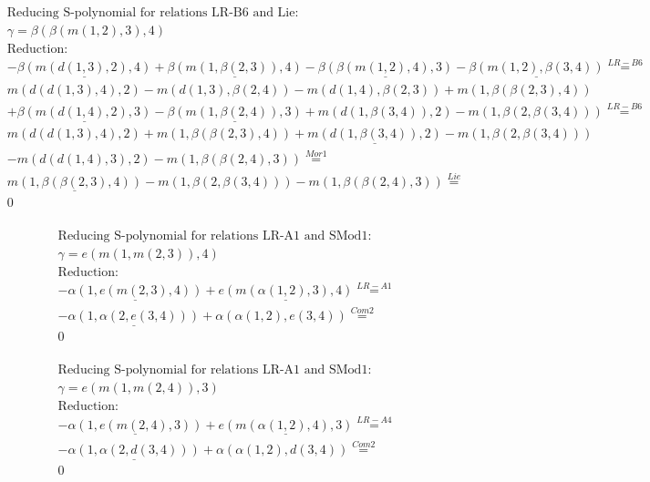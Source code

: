 \documentclass[11pt]{amsart}
\begin{document}
\begin{align*} 
& \text{Reducing S-polynomial for relations LR-B6 and Lie:} \\ 
& \gamma = \beta(\beta(m(1,2),3),4) \\ 
& \text{Reduction}: \\& - \underline{\beta(m(d(1,3),2),4)} + \underline{\beta(m(1,\beta(2,3)),4)} - \underline{\beta(\beta(m(1,2),4),3)} - \underline{\beta(m(1,2),\beta(3,4))} \stackrel{ LR-B6 }{=}  \\ 
&m(d(d(1,3),4),2) - m(d(1,3),\beta(2,4)) - m(d(1,4),\beta(2,3)) + m(1,\beta(\beta(2,3),4))\\ 
 &  + \underline{\beta(m(d(1,4),2),3)} - \underline{\beta(m(1,\beta(2,4)),3)} + m(d(1,\beta(3,4)),2) - m(1,\beta(2,\beta(3,4))) \stackrel{ LR-B6 }{=}  \\ 
&m(d(d(1,3),4),2) + m(1,\beta(\beta(2,3),4)) + \underline{m(d(1,\beta(3,4)),2)} - m(1,\beta(2,\beta(3,4)))\\ 
 &  - m(d(d(1,4),3),2) - m(1,\beta(\beta(2,4),3)) \stackrel{ Mor1 }{=}  \\ 
&\underline{m(1,\beta(\beta(2,3),4))} - m(1,\beta(2,\beta(3,4))) - m(1,\beta(\beta(2,4),3)) \stackrel{ Lie }{=}  \\ 
&0\\ 
\end{align*} 
 
\begin{align*} 
& \text{Reducing S-polynomial for relations LR-A1 and SMod1:} \\ 
& \gamma = e(m(1,m(2,3)),4) \\ 
& \text{Reduction}: \\& - \underline{\alpha(1,e(m(2,3),4))} + \underline{e(m(\alpha(1,2),3),4)} \stackrel{ LR-A1 }{=}  \\ 
& - \underline{\alpha(1,\alpha(2,e(3,4)))} + \alpha(\alpha(1,2),e(3,4)) \stackrel{ Com2 }{=}  \\ 
&0\\ 
\end{align*} 
 
\begin{align*} 
& \text{Reducing S-polynomial for relations LR-A1 and SMod1:} \\ 
& \gamma = e(m(1,m(2,4)),3) \\ 
& \text{Reduction}: \\& - \underline{\alpha(1,e(m(2,4),3))} + \underline{e(m(\alpha(1,2),4),3)} \stackrel{ LR-A4 }{=}  \\ 
& - \underline{\alpha(1,\alpha(2,d(3,4)))} + \alpha(\alpha(1,2),d(3,4)) \stackrel{ Com2 }{=}  \\ 
&0\\ 
\end{align*} 
 
\end{document}
